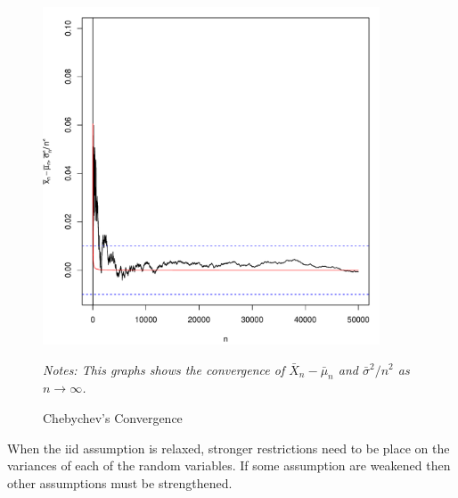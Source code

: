 \documentclass[english,12pt]{book}\usepackage[]{graphicx}\usepackage[]{xcolor}
\newenvironment{knitrout}{}{} %
\begin{document}
\begin{figure}[H]
  \caption{Chebychev's Convergence}
    \label{fig:chebychev}
         \centering
    \begin{minipage}{.9\linewidth}
\begin{knitrout}
\color{fgcolor}

{\centering \includegraphics[width=10cm,height=10cm]{figure/cheby-convergence-1} 

}


\end{knitrout}
\footnotesize
		\emph{Notes: This graphs shows the convergence of $\bar{X}_n - \bar{\mu}_n$ and $\bar{\sigma}^2 / n^2$ as $n\to\infty$.}
	\end{minipage}
\end{figure}

\begin{remark}
  When the iid assumption is relaxed, stronger restrictions need to be place on the variances of each of the random variables. If some assumption are weakened then other assumptions must be strengthened. 
\end{remark}






\end{document}
